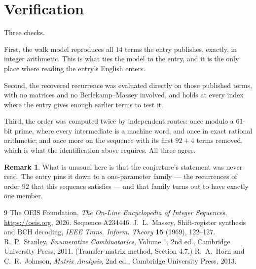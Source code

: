 \documentclass[11pt,a4paper]{article}
\theoremstyle{plain}
\theoremstyle{definition}
\newtheorem{remark}[theorem]{Remark}
\begin{document}
\section{Verification}

Three checks.

First, the walk model reproduces all $14$ terms the entry publishes, exactly, in integer
arithmetic. This is what ties the model to the entry, and it is the only place where reading
the entry's English enters.

Second, the recovered recurrence was evaluated directly on those published terms, with no
matrices and no Berlekamp--Massey involved, and holds at every index where the entry gives
enough earlier terms to test it.

Third, the order was computed twice by independent routes: once modulo a $61$-bit prime, where
every intermediate is a machine word, and once in exact rational arithmetic; and once more on
the sequence with its first $92+4$ terms removed, which is what the identification above
requires. All three agree.

\begin{remark}
What is unusual here is that the conjecture's statement was never read. The entry pins it down
to a one-parameter family --- the recurrences of order $92$ that this sequence satisfies
--- and that family turns out to have exactly one member.
\end{remark}

\begin{thebibliography}{9}
 The OEIS Foundation, \emph{The On-Line Encyclopedia of Integer
Sequences}, \url{https://oeis.org}, 2026. Sequence A234446.
 J.~L.~Massey, Shift-register synthesis and BCH decoding, \emph{IEEE
Trans. Inform. Theory} \textbf{15} (1969), 122--127.
 R.~P.~Stanley, \emph{Enumerative Combinatorics}, Volume 1, 2nd ed.,
Cambridge University Press, 2011. (Transfer-matrix method, Section 4.7.)
 R.~A.~Horn and C.~R.~Johnson, \emph{Matrix Analysis}, 2nd ed., Cambridge
University Press, 2013.
\end{thebibliography}
\end{document}
